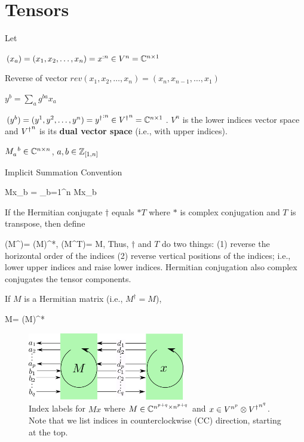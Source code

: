 \section{Tensors}
\label{sec-tensors}
Let 

$(x_a)=(x_1, x_2, \ldots, x_n) = x^{:n}\in V^n={ \mathbb{C}}^{n\times 1}$

Reverse of vector $rev(x_1, x_2, \ldots, x_n)=
(x_n, x_{n-1},
\ldots, x_1)$

$y^b = \sum_a g^{ba} x_a$

$(y^b)=(y^1, y^2, \ldots, y^n)= {y^\dagger}^{:n}\in {V^\dagger}^n={ \mathbb{C}}^{n\times 1}$. $V^n$ is the lower indices vector space and
${V^\dagger}^n$ is its {\bf dual vector space} (i.e., with upper indices).



$M\indices{_a^b}\in \CC^{n\times n}$, $a, b\in{\mathbb{Z}}_{[1,n]}$

Implicit Summation Convention

\beq
Mx_b = \sum_{b=1}^n
Mx_b
\eeq



If the Hermitian conjugate $\dagger$
equals $*T$ where $*$ is complex conjugation and $T$ is transpose,
then define

\beq
(M^\dagger)= (M)^*,
\quad
(M^T)= M,
\eeq
Thus, $\dagger$ and $T$ 
do two things: (1) reverse the horizontal order of the indices (2)
reverse vertical positions
of the indices; i.e., 
lower upper indices and raise lower indices.
Hermitian conjugation 
also complex conjugates the tensor components.

If $M$ is a Hermitian matrix (i.e., $M^\dagger =M$),

\beq
M= (M)^*
\eeq



\begin{figure}[h!]
\centering
\includegraphics[width=2.7in]
{conventions/index-labels-Mx.png}
\caption{Index labels for $Mx$
where $M
\in { \mathbb{C}}^{n^{p+q}\times n^{p+q}}$ and
$x\in V^{n^p}\otimes {V^\dagger}^{n^q}$.
Note that we  list indices in counterclockwise (CC) direction, 
starting at the top.}
\label{fig-index-labels-Mx}
\end{figure}

